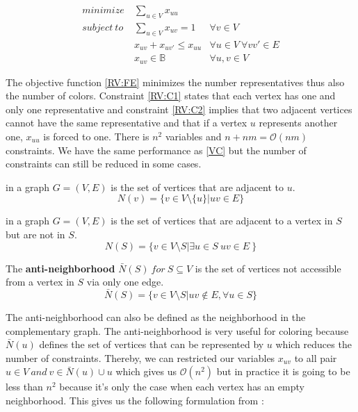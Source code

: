 \begin{eqnarray}
minimize\ & \displaystyle\sum_{u \in V}  x_{uu}& \label{RV:FE} \\
subject\ to & \displaystyle\sum_{u \in V} x_{uv} = 1 & \forall v \in V\ \label{RV:C1}\\
& x_{uv} + x_{uv\prime} \leq x_{uu} & \forall u \in V\ \forall vv\prime \in E \label{RV:C2}\\
&  x_{uv} \in \mathbb{B} &  \forall u,v \in V
\end{eqnarray}

The objective function \ref{RV:FE} minimizes the number representatives thus also the number of colors. Constraint \ref{RV:C1} states that each vertex has one and only one representative and constraint \ref{RV:C2} implies that two adjacent vertices cannot have the same representative and that if a vertex $u$ represents another one, $x_{uu}$ is forced to one. There is $n^2$ variables and $n + nm = \mathcal{O}(nm)$ constraints. We have the same performance as \ref{VC} but the number of constraints can still be reduced in some cases.

\begin{mydef}
\label{def:neighbourhoodVertex}
 in a graph $G=(V,E)$ is the set of vertices that are adjacent to $u$.
\[N(v) = \{v\in V \setminus \{u\} | uv \in E \}\]
\end{mydef}


\begin{mydef}
\label{def:neighbourhoodSubset}
 in a graph $G=(V,E)$ is the set of vertices that are adjacent to a vertex in $S$ but are not in $S$.
\[N(S) = \{v\in V \setminus S | \exists u \in S\ uv \in E\  \}\]
\end{mydef}

\begin{mydef}
\label{def:antiNeighbourhoodSubset}
The \textbf{ anti-neighborhood} $\bar{N}(S)\ for\ S \subseteq V$ is the set of vertices not accessible from a vertex in $S$ via only one edge.
\[\bar{N}(S) = \{ v \in V \setminus S | uv \notin E ,\forall u \in S \}\]
\end{mydef}

The anti-neighborhood can also be defined as the neighborhood in the complementary graph. The anti-neighborhood is very useful for coloring because $\bar{N}(u)$ defines the set of vertices that can be represented by $u$ which reduces the number of constraints. Thereby, we can restricted our variables $x_{uv}$ to all pair $u \in V\ and\ v \in \bar{N}(u) \cup u$ which gives us $\mathcal{O}(n^2)$ but in practice it is going to be less than $n^2$ because it's only the case when each vertex has an empty neighborhood. This gives us the following formulation from \cite{polytope} :

